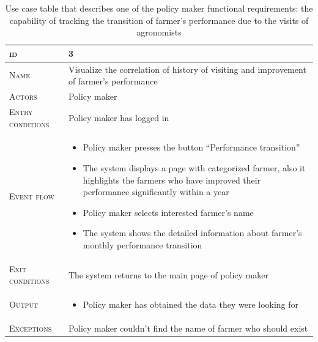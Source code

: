\begin{table}[H]
    \centering
    \begin{tabular}{|l|p{}|}
        \hline %
    	\textsc{id}                 &   3\\
    	\hline %
    	\textsc{Name}               &   Visualize the correlation of history of visiting and improvement of farmer's performance\\
    	\hline %
    	\textsc{Actors}             &   Policy maker\\
    	\hline %
    	\textsc{Entry conditions}   &   Policy maker has logged in\\
    	\hline %
    	\textsc{Event flow}         &   \footnotesize
            	                        \begin{itemize}
                                    	    \item Policy maker presses the button “Performance transition”
                                    		\item The system displays a page with categorized farmer, also it highlights the farmers who have improved their performance significantly within a year
                                    		\item Policy maker selects interested farmer’s name
                                    		\item The system shows the detailed information about farmer’s monthly performance transition 
                                        \end{itemize}\\
        \hline %
        \textsc{Exit conditions}    &  The system returns to the main page of policy maker\\
    	\hline %
    	\textsc{Output}             &  \begin{itemize}
    	    \item Policy maker has obtained the data they were looking for
    	\end{itemize}\\
    	\hline %
    	\textsc{Exceptions}         &  Policy maker couldn’t find the name of farmer who should exist\\
    	\hline %
        
    \end{tabular}
    \caption{\label{tab:visualize_iprovement}Use case table that describes one of the policy maker functional requirements:  the capability of tracking the transition of farmer's performance due to the visits of agronomists} %
\end{table}

